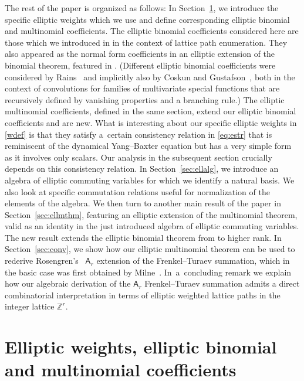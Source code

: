 \documentclass[pdftex]{sigma}
\numberwithin{equation}{section}
\theoremstyle{definition}
\begin{document}
The rest of the paper is organized as follows:
In Section~\ref{sec:bmcoeffs}, we introduce the specific
elliptic weights which we use and define corresponding
elliptic binomial and multinomial coefficients.
The elliptic binomial coefficients considered
here are those which we introduced in \cite{S}
in the context of lattice path enumeration.
They also appeared as the normal form coefficients in an
elliptic extension of the binomial theorem, featured in
\cite[Section~4]{S1}. (Different elliptic binomial coefficients
were considered by Rains~\cite[Definition~11]{R06}
and implicitly also by Coskun and Gustafson~\cite{CG},
both in the context of convolutions for families of multivariate
special functions that are recursively defined by vanishing
properties and a branching rule.)
The elliptic multinomial coefficients, defined in the same section,
extend our elliptic binomial coefficients and are new.
What is interesting about our specific elliptic weights in \eqref{wdef}
is that they satisfy a~certain consistency relation in \eqref{eq:estr}
that is reminiscent of the dynamical Yang--Baxter
equation but has a very simple form as it
involves only scalars. Our analysis in the subsequent section
crucially depends on this consistency relation.
In Section~\ref{sec:ellalg}, we introduce an
algebra of elliptic commuting variables for which we
identify a natural basis. We also look at specific
commutation relations useful for normalization
of the elements of the algebra.
We then turn to another main result of the paper in
Section~\ref{sec:ellmthm}, featuring an elliptic extension
of the multinomial theorem, valid as an identity in the
just introduced algebra of elliptic commuting variables.
The new result extends the elliptic binomial theorem from
\cite[Section~4]{S1} to higher rank. In Section~\ref{sec:conv},
we show how our elliptic
multinomial theorem can be used to rederive
Rosengren's~\cite[Theorem~5.1]{R04} $\mathsf A_r$
extension of the Frenkel--Turaev summation,
which in the basic case was first obtained by
Milne~\cite[Theorem~6.17]{M88}.
In~a~concluding remark we explain how our algebraic derivation
of the $\mathsf A_r$ Frenkel--Turaev summation admits
a direct combinatorial interpretation in terms of elliptic
weighted lattice paths in the integer lattice $\mathbb Z^r$.


\section{Elliptic weights, elliptic binomial and
 multinomial coefficients}\label{sec:bmcoeffs}
\end{document}
